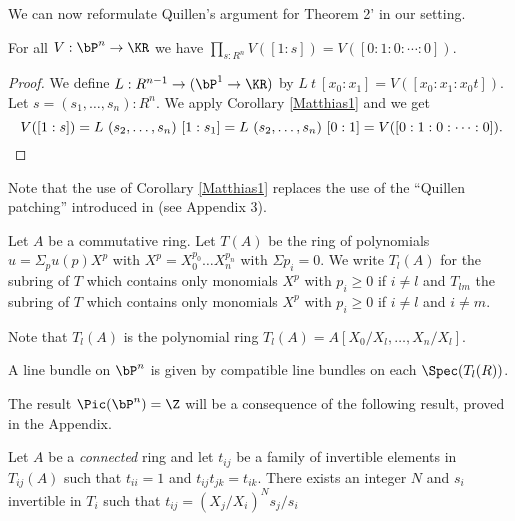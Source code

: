 We can now reformulate Quillen's argument for Theorem 2' \cite{Quillen} in our setting.

\begin{proposition}\label{trivial}
  For all $V:\bP^n\rightarrow \KR$ we have ${\prod_{s:R^n}V([1:s]) = V([0:1:0:\cdots :0])}$.
\end{proposition}

\begin{proof}
  We define $L:R^{n-1}\rightarrow (\bP^1 \to \KR)$ by $L~t~[x_0:x_1] = V([x_0:x_1:x_0t])$.
  Let $s=(s_1,\dots,s_{n}):R^{n}$. We apply Corollary \ref{Matthias1} and we get
  \[
   V([1:s]) = L~(s_2,\dots,s_n)~[1:s_1] = L~(s_2,\dots,s_n)~[0:1] = V([0:1:0:\cdots :0])
   \rlap{.}
  \]
\end{proof}

 Note that the use of Corollary \ref{Matthias1} replaces the use of the ``Quillen patching''
 \cite{lombardi-quitte} introduced in \cite{Quillen} (see Appendix 3).

\medskip

Let $A$ be a commutative ring.
Let $T(A)$ be the ring of polynomials $u = \Sigma_p u(p)X^p$ with
$X^p = X_0^{p_0}\dots X_n^{p_n}$ with $\Sigma p_i = 0$. We write $T_l(A)$ for the subring
of $T$ which contains only monomials $X^p$ with $p_i\geqslant 0$ if $i\neq l$
and $T_{lm}$ the subring of $T$ 
which contains only monomials $X^p$ with $p_i\geqslant 0$ if $i\neq l$ and $i\neq m$.

Note that $T_l(A)$ is the polynomial ring $T_l(A) = A[X_0/X_l,\dots,X_n/X_l]$.

A line bundle on $\bP^n$ is given by compatible line bundles on each $\Spec(T_l(R))$.

The result $\Pic(\bP^n) = \Z$ will be a consequence of the following result, proved in the Appendix.

\begin{proposition}\label{units}
  Let $A$ be a {\em connected} ring and let $t_{ij}$ be a family of  invertible elements in $T_{ij}(A)$ such that $t_{ii} = 1$
  and $t_{ij}t_{jk} = t_{ik}$. There exists an integer $N$ and $s_i$ invertible in $T_i$ such that $t_{ij} = (X_j/X_i)^Ns_j/s_i$ 
\end{proposition}






